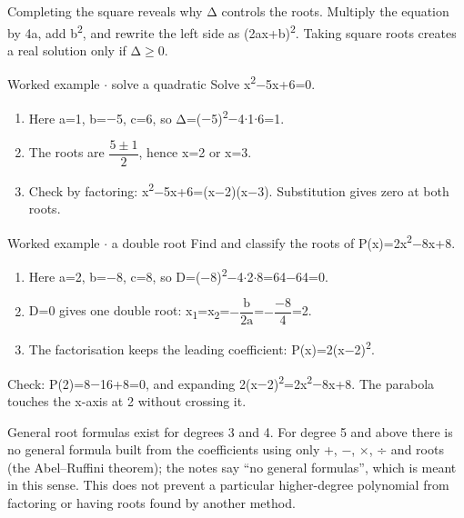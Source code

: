 \documentclass[11pt]{article}
\begin{document}
\begin{keepsection}
\begin{keepsection}
Completing the square reveals why Δ controls the roots. Multiply the equation by 4a, add b\textsuperscript{2}, and rewrite the left side as (2ax+b)\textsuperscript{2}. Taking square roots creates a real solution only if Δ\ensuremath{\geq}0.

\begin{workedbox}{Worked example \ensuremath{\cdot} solve a quadratic}
Solve x\textsuperscript{2}\ensuremath{-}5x+6=0.

\begin{enumerate}
\item Here a=1, b=\ensuremath{-}5, c=6, so Δ=(\ensuremath{-}5)\textsuperscript{2}\ensuremath{-}4\ensuremath{\cdot}1\ensuremath{\cdot}6=1.
\item The roots are {\small\ensuremath{\dfrac{5\pm 1}{2}}}, hence x=2 or x=3.
\item Check by factoring: x\textsuperscript{2}\ensuremath{-}5x+6=(x\ensuremath{-}2)(x\ensuremath{-}3). Substitution gives zero at both roots.
\end{enumerate}
\end{workedbox}

\begin{workedbox}{Worked example \ensuremath{\cdot} a double root}
Find and classify the roots of P(x)=2x\textsuperscript{2}\ensuremath{-}8x+8.

\begin{enumerate}
\item Here a=2, b=\ensuremath{-}8, c=8, so D=(\ensuremath{-}8)\textsuperscript{2}\ensuremath{-}4\ensuremath{\cdot}2\ensuremath{\cdot}8=64\ensuremath{-}64=0.
\item D=0 gives one double root: x\textsubscript{1}=x\textsubscript{2}=\ensuremath{-}{\small\ensuremath{\dfrac{\mathrm{b}}{2\mathrm{a}}}}=\ensuremath{-}{\small\ensuremath{\dfrac{-8}{4}}}=2.
\item The factorisation keeps the leading coefficient: P(x)=2(x\ensuremath{-}2)\textsuperscript{2}.
\end{enumerate}

Check: P(2)=8\ensuremath{-}16+8=0, and expanding 2(x\ensuremath{-}2)\textsuperscript{2}=2x\textsuperscript{2}\ensuremath{-}8x+8. The parabola touches the x-axis at 2 without crossing it.
\end{workedbox}

General root formulas exist for degrees 3 and 4. For degree 5 and above there is no general formula built from the coefficients using only +, \ensuremath{-}, \ensuremath{\times}, ÷ and roots (the Abel–Ruffini theorem); the notes say “no general formulas”, which is meant in this sense. This does not prevent a particular higher-degree polynomial from factoring or having roots found by another method.


\end{keepsection}
\end{keepsection}
\end{document}
